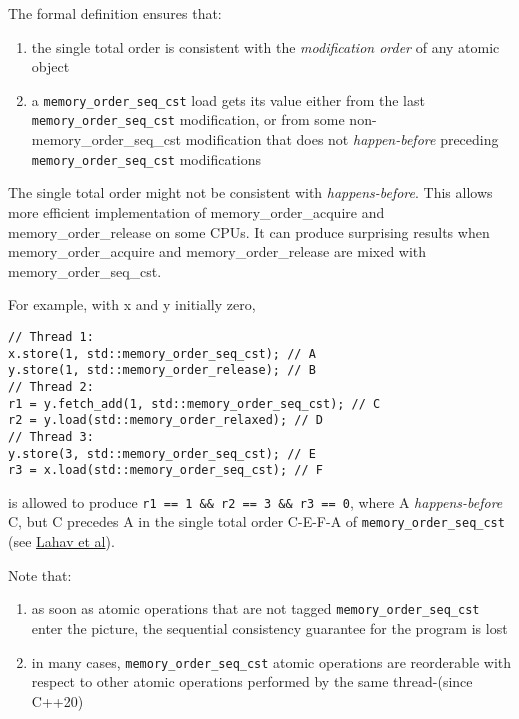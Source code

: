 \documentclass[a4paper,12pt,notitlepage,twoside,openright]{article}
\begin{document}
\begin{oframed}
The formal definition ensures that:

\begin{enumerate}

\item
  the single total order is consistent with the \emph{modification
  order} of any atomic object
\item
  a \texttt{memory\_order\_seq\_cst} load gets its value either from the last
  \texttt{memory\_order\_seq\_cst} modification, or from some
  non-memory\_order\_seq\_cst modification that does not
  \emph{happen-before} preceding \texttt{memory\_order\_seq\_cst} modifications
\end{enumerate}

The single total order might not be consistent with
\emph{happens-before}. This allows more efficient implementation of
memory\_order\_acquire and memory\_order\_release on some CPUs. It can
produce surprising results when memory\_order\_acquire and
memory\_order\_release are mixed with memory\_order\_seq\_cst.

For example, with x and y initially zero,

\begin{verbatim}
// Thread 1:
x.store(1, std::memory_order_seq_cst); // A
y.store(1, std::memory_order_release); // B
// Thread 2:
r1 = y.fetch_add(1, std::memory_order_seq_cst); // C
r2 = y.load(std::memory_order_relaxed); // D
// Thread 3:
y.store(3, std::memory_order_seq_cst); // E
r3 = x.load(std::memory_order_seq_cst); // F
\end{verbatim}

is allowed to produce \texttt{r1 == 1 \&\& r2 == 3 \&\& r3 == 0}, where A
\emph{happens-before} C, but C precedes A in the single total order
C-E-F-A of \texttt{memory\_order\_seq\_cst} (see
\href{https://plv.mpi-sws.org/scfix/paper.pdf}{Lahav et al}).

Note that:

\begin{enumerate}

\item
  as soon as atomic operations that are not tagged
  \texttt{memory\_order\_seq\_cst} enter the picture, the sequential consistency
  guarantee for the program is lost
\item
  in many cases, \texttt{memory\_order\_seq\_cst} atomic operations are
  reorderable with respect to other atomic operations performed by the
  same thread-(since C++20)
\end{enumerate}
\end{oframed}
\end{document}
